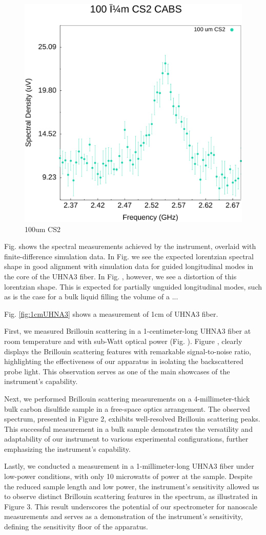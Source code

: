 \documentclass[%
  reprint,
  superscriptaddress,
  amsmath,amssymb,
  aps,
  prapplied,
]{revtex4-2}
\begin{document}
\begin{figure}[t]
  \centering
  \includegraphics[width=.45\textwidth]{100umCS2.pdf}
  \caption{100um CS2}\label{fig:100umCS2}
\end{figure}

Fig. shows the spectral measurements achieved by the instrument, overlaid with finite-difference simulation data. In Fig. we see the expected lorentzian spectral shape in good alignment with simulation data for guided longitudinal modes in the core of the UHNA3 fiber. In Fig. , however, we see a distortion of this lorentzian shape. This is expected for partially unguided longitudinal modes, such as is the case for a bulk liquid filling the volume of a ...

Fig. \ref{fig:1cmUHNA3} shows a measurement of 1cm of UHNA3 fiber.

First, we measured Brillouin scattering in a 1-centimeter-long UHNA3 fiber at room temperature and with sub-Watt optical power (Fig. ). Figure , clearly displays the Brillouin scattering features with remarkable signal-to-noise ratio, highlighting the effectiveness of our apparatus in isolating the backscattered probe light. This observation serves as one of the main showcases of the instrument's capability.

Next, we performed Brillouin scattering measurements on a 4-millimeter-thick bulk carbon disulfide sample in a free-space optics arrangement. The observed spectrum, presented in Figure 2, exhibits well-resolved Brillouin scattering peaks. This successful measurement in a bulk sample demonstrates the versatility and adaptability of our instrument to various experimental configurations, further emphasizing the instrument's capability.

Lastly, we conducted a measurement in a 1-millimeter-long UHNA3 fiber under low-power conditions, with only 10 microwatts of power at the sample. Despite the reduced sample length and low power, the instrument's sensitivity allowed us to observe distinct Brillouin scattering features in the spectrum, as illustrated in Figure 3. This result underscores the potential of our spectrometer for nanoscale measurements and serves as a demonstration of the instrument's sensitivity, defining the sensitivity floor of the apparatus.
\end{document}
